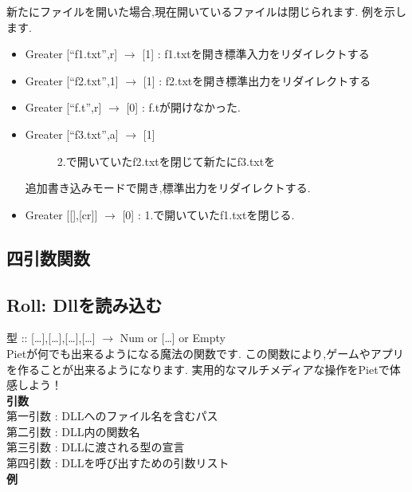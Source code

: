 新たにファイルを開いた場合,現在開いているファイルは閉じられます.
例を示します.

\begin{itemize}
\item
  Greater {[}``f1.txt'',r{]} $\to$ {[}1{]} :
  f1.txtを開き標準入力をリダイレクトする
\item
  Greater {[}``f2.txt'',1{]} $\to$ {[}1{]} :
  f2.txtを開き標準出力をリダイレクトする
\item
  Greater {[}``f.t'',r{]} $\to$ {[}0{]} : f.tが開けなかった.
\item
  \begin{description}
  \item[Greater {[}``f3.txt'',a{]} $\to$ {[}1{]}]
  2.で開いていたf2.txtを閉じて新たにf3.txtを
  \end{description}

  追加書き込みモードで開き,標準出力をリダイレクトする.
\item
  Greater {[}{[}{]},{[}cr{]}{]} $\to$ {[}0{]} :
  1.で開いていたf1.txtを閉じる.
\end{itemize}

\subsection{四引数関数}

\subsection{Roll: Dllを読み込む}

型 :: {[}\ldots{}{]},{[}\ldots{}{]},{[}\ldots{}{]},{[}\ldots{}{]}
$\to$ Num or {[}\ldots{}{]} or
Empty\\Pietが何でも出来るようになる魔法の関数です.
この関数により,ゲームやアプリを作ることが出来るようになります.
実用的なマルチメディアな操作をPietで体感しよう！\\\textbf{引数}\\第一引数
: DLLへのファイル名を含むパス\\第二引数 : DLL内の関数名\\第三引数 :
DLLに渡される型の宣言\\第四引数 :
DLLを呼び出すための引数リスト\\\textbf{例}

